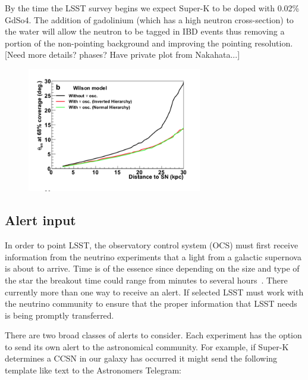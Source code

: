 \documentclass[12pt, letterpaper]{article}
\newcommand{\superk}  {Super\nobreakdash-K\xspace}
\begin{document}
By the time the LSST survey begins we expect \superk to be doped with
0.02\% GdSo4.  The addition of gadolinium (which has a high neutron
cross-section) to the water will allow the neutron to be tagged in IBD
events thus removing a portion of the non-pointing background and
improving the pointing resolution. [Need more details? phases? Have
private plot from Nakahata...]

\begin{figure}
  \begin{center}
    \includegraphics[width=3.0in]{SK-realtime-pointing-resolution}
    \caption{}
    \label{fig:SK-realtime-pointing-resolution}
  \end{center}
\end{figure}

\subsection{Alert input}

In order to point LSST, the observatory control system (OCS) must first
receive information from the neutrino experiments that a light from a
galactic supernova is about to arrive.  Time is of the essence since
depending on the size and type of the star the breakout time could
range from minutes to several hours~\cite{2013ApJ...778...81K}.  There
currently more than one way to receive an alert. If selected LSST must
work with the neutrino community to ensure that the proper information
that LSST needs is being promptly transferred.

There are two broad classes of alerts to consider.  Each experiment
has the option to send its own alert to the astronomical community.
For example, if \superk determines a CCSN in our galaxy has occurred
it might send the following template like text to the Astronomers
Telegram:
\end{document}
